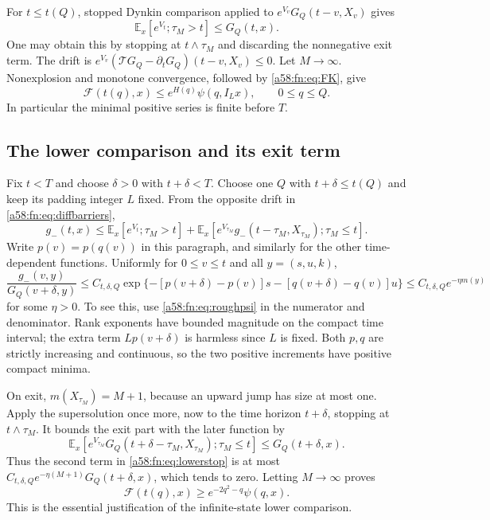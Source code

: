 \documentclass[11pt,letterpaper]{article}
\theoremstyle{remark}
\newcommand{\TT}{\mathcal T}
\newcommand{\FF}{\mathcal F}
\newcommand{\E}{\mathbb E}
\begin{document}
For $t\le t(Q)$, stopped Dynkin comparison applied to
$e^{V_v}G_Q(t-v,X_v)$ gives
\[
 \E_x\left[e^{V_t};\tau_M>t\right]\le G_Q(t,x).
\]
One may obtain this by stopping at $t\wedge\tau_M$ and discarding the nonnegative exit term. The drift is
$e^{V_v}(\TT G_Q-\partial_tG_Q)(t-v,X_v)\le0$.
Let $M\to\infty$. Nonexplosion and monotone convergence, followed by \eqref{a58:fn:eq:FK}, give
\begin{equation}\label{a58:fn:eq:upperF}
 \FF(t(q),x)\le e^{H(q)}\psi(q,I_Lx),\qquad 0\le q\le Q.
\end{equation}
In particular the minimal positive series is finite before $T$.

\subsection{The lower comparison and its exit term}
Fix $t<T$ and choose $\delta>0$ with $t+\delta<T$. Choose one $Q$ with $t+\delta\le t(Q)$ and keep its padding integer $L$ fixed. From the opposite drift in \eqref{a58:fn:eq:diffbarriers},
\begin{equation}\label{a58:fn:eq:lowerstop}
 g_-(t,x)\le
 \E_x[e^{V_t};\tau_M>t]
 +\E_x[e^{V_{\tau_M}}g_-(t-\tau_M,X_{\tau_M});\tau_M\le t].
\end{equation}
Write $p(v)=p(q(v))$ in this paragraph, and similarly for the other time-dependent functions. Uniformly for $0\le v\le t$ and all $y=(s,u,k)$,
\begin{equation}\label{a58:fn:eq:ratioexit}
 \frac{g_-(v,y)}{G_Q(v+\delta,y)}
 \le C_{t,\delta,Q}
 \exp\{-[p(v+\delta)-p(v)]s-[q(v+\delta)-q(v)]u\}
 \le C_{t,\delta,Q}e^{-\eta m(y)}
\end{equation}
for some $\eta>0$. To see this, use \eqref{a58:fn:eq:roughpsi} in the numerator and denominator. Rank exponents have bounded magnitude on the compact time interval; the extra term $Lp(v+\delta)$ is harmless since $L$ is fixed. Both $p,q$ are strictly increasing and continuous, so the two positive increments have positive compact minima.

On exit, $m(X_{\tau_M})=M+1$, because an upward jump has size at most one. Apply the supersolution once more, now to the time horizon $t+\delta$, stopping at $t\wedge\tau_M$. It bounds the exit part with the later function by
\[
 \E_x[e^{V_{\tau_M}}G_Q(t+\delta-\tau_M,X_{\tau_M});\tau_M\le t]
 \le G_Q(t+\delta,x).
\]
Thus the second term in \eqref{a58:fn:eq:lowerstop} is at most
$C_{t,\delta,Q}e^{-\eta(M+1)}G_Q(t+\delta,x)$, which tends to zero. Letting $M\to\infty$ proves
\begin{equation}\label{a58:fn:eq:lowerF}
 \FF(t(q),x)\ge e^{-2q^2-q}\psi(q,x).
\end{equation}
This is the essential justification of the infinite-state lower comparison.
\end{document}
